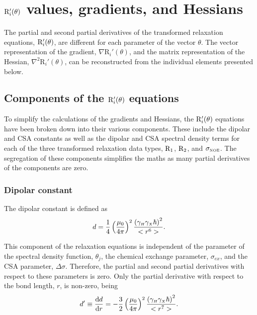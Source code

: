 
\section{$\mathrm{R}_i'(\theta)$ values, gradients, and Hessians}

The partial and second partial derivatives of the transformed relaxation equations, $\mathrm{R}_i'(\theta)$, are different for each parameter of the vector $\theta$.  The vector representation of the gradient, $\nabla \textrm{R}_i'(\theta)$, and the matrix representation of the Hessian, $\nabla^2 \textrm{R}_i'(\theta)$, can be reconstructed from the individual elements presented below.



\subsection{Components of the $\mathrm{R}_i'(\theta)$ equations}

To simplify the calculations of the gradients and Hessians, the $\mathrm{R}_i'(\theta)$ equations have been broken down into their various components.  These include the dipolar and CSA constants as well as the dipolar and CSA spectral density terms for each of the three transformed relaxation data types, $\mathrm{R}_1$, $\mathrm{R}_2$, and $\sigma_{\scriptscriptstyle \mathrm{NOE}}$.  The segregation of these components simplifies the maths as many partial derivatives of the components are zero.


\subsubsection{Dipolar constant}

The dipolar constant is defined as
\begin{equation}
    d = \frac{1}{4} \left(\frac{\mu_0}{4\pi}\right)^2 \frac{\left( \gamma_{\scriptscriptstyle H} \gamma_{\scriptscriptstyle X} \hbar \right)^2}{<r^6>}. \label{eq: Ri': d}
\end{equation}

\noindent This component of the relaxation equations is independent of the parameter of the spectral density function, $\theta_j$, the chemical exchange parameter, $\sigma_{ex}$, and the CSA parameter, $\Delta\sigma$.  Therefore, the partial and second partial derivatives with respect to these parameters is zero.  Only the partial derivative with respect to the bond length, $r$, is non-zero, being
\begin{equation}
    d' \equiv \frac{\mathrm{d} d}{\mathrm{d} r} = - \frac{3}{2} \left(\frac{\mu_0}{4\pi}\right)^2 \frac{\left( \gamma_{\scriptscriptstyle H} \gamma_{\scriptscriptstyle X} \hbar \right)^2}{<r^7>}. \label{eq: Ri': d'}
\end{equation}

